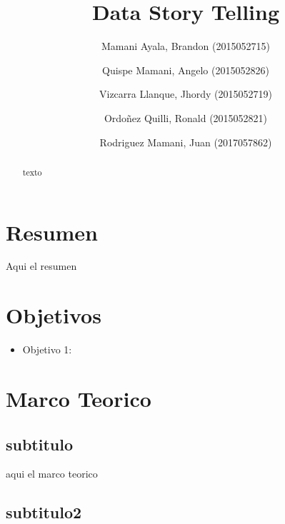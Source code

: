 \documentclass[preprint,12pt]{elsarticle}
\begin{document}
	
	\begin{frontmatter}
		
		
		\title{\huge Data Story Telling}
		
		\author{Mamani Ayala, Brandon        (2015052715)}
		\author{Quispe Mamani, Angelo	      (2015052826)}
		\author{Vizcarra Llanque, Jhordy	      (2015052719)}
		\author{Ordoñez Quilli, Ronald          (2015052821)}
		\author{Rodriguez Mamani, Juan      (2017057862)}
		
		\address{Tacna, Perú}
		
		\begin{abstract}
			texto
	
		\end{abstract}
\end{frontmatter}

	
	
	\section{Resumen}
		Aqui el resumen\\

	
	

\section{Objetivos}
		\begin{itemize}
		\item Objetivo 1: 
	\end{itemize}

	
	

\section{Marco Teorico}
	
\subsection{subtitulo}	

	aqui el marco teorico 
		
\subsection{subtitulo2}
	
\end{document}
